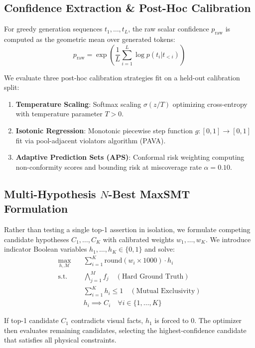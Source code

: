 \documentclass[10pt,twocolumn,letterpaper]{article}
\begin{document}
\subsection{Confidence Extraction \& Post-Hoc Calibration}
For greedy generation sequences $t_1, \dots, t_L$, the raw scalar confidence $p_{\text{raw}}$ is computed as the geometric mean over generated tokens:
\begin{equation}
p_{\text{raw}} = \exp\left( \frac{1}{L} \sum_{i=1}^L \log p(t_i | t_{<i}) \right)
\end{equation}

We evaluate three post-hoc calibration strategies fit on a held-out calibration split:
\begin{enumerate}
    \item \textbf{Temperature Scaling}: Softmax scaling $\sigma(z / T)$ optimizing cross-entropy with temperature parameter $T > 0$.
    \item \textbf{Isotonic Regression}: Monotonic piecewise step function $g: [0, 1] \to [0, 1]$ fit via pool-adjacent violators algorithm (PAVA).
    \item \textbf{Adaptive Prediction Sets (APS)}: Conformal risk weighting computing non-conformity scores and bounding risk at miscoverage rate $\alpha = 0.10$.
\end{enumerate}

\subsection{Multi-Hypothesis $N$-Best MaxSMT Formulation}
Rather than testing a single top-1 assertion in isolation, we formulate competing candidate hypotheses $C_1, \dots, C_K$ with calibrated weights $w_1, \dots, w_K$. We introduce indicator Boolean variables $h_1, \dots, h_K \in \{0, 1\}$ and solve:
\begin{align}
\max_{h, \mathcal{M}} \quad & \sum_{i=1}^K \text{round}(w_i \times 1000) \cdot h_i \\
\text{s.t.} \quad & \bigwedge_{j=1}^M f_j \quad (\text{Hard Ground Truth}) \\
& \sum_{i=1}^K h_i \le 1 \quad (\text{Mutual Exclusivity}) \\
& h_i \implies C_i \quad \forall i \in \{1, \dots, K\}
\end{align}

If top-1 candidate $C_1$ contradicts visual facts, $h_1$ is forced to $0$. The optimizer then evaluates remaining candidates, selecting the highest-confidence candidate that satisfies all physical constraints.
\end{document}

